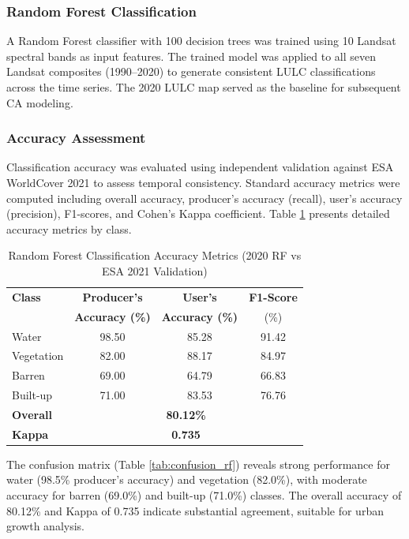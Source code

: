 \documentclass[conference]{IEEEtran}
\begin{document}
\subsubsection{Random Forest Classification}
A Random Forest classifier with 100 decision trees was trained using 10 Landsat spectral bands as input features. The trained model was applied to all seven Landsat composites (1990--2020) to generate consistent LULC classifications across the time series. The 2020 LULC map served as the baseline for subsequent CA modeling.

\subsubsection{Accuracy Assessment}
Classification accuracy was evaluated using independent validation against ESA WorldCover 2021 to assess temporal consistency. Standard accuracy metrics were computed including overall accuracy, producer's accuracy (recall), user's accuracy (precision), F1-scores, and Cohen's Kappa coefficient. Table \ref{tab:rf_accuracy} presents detailed accuracy metrics by class.

\begin{table}[!t]
\caption{Random Forest Classification Accuracy Metrics (2020 RF vs ESA 2021 Validation)}
\label{tab:rf_accuracy}
\centering
\small
\begin{tabular}{lccc}
\toprule
\textbf{Class} & \textbf{Producer's} & \textbf{User's} & \textbf{F1-Score} \\
 & \textbf{Accuracy (\%)} & \textbf{Accuracy (\%)} & (\%) \\
\midrule
Water & 98.50 & 85.28 & 91.42 \\
Vegetation & 82.00 & 88.17 & 84.97 \\
Barren & 69.00 & 64.79 & 66.83 \\
Built-up & 71.00 & 83.53 & 76.76 \\
\midrule
\textbf{Overall} & \multicolumn{3}{c}{\textbf{80.12\%}} \\
\textbf{Kappa} & \multicolumn{3}{c}{\textbf{0.735}} \\
\bottomrule
\end{tabular}
\end{table}

The confusion matrix (Table \ref{tab:confusion_rf}) reveals strong performance for water (98.5\% producer's accuracy) and vegetation (82.0\%), with moderate accuracy for barren (69.0\%) and built-up (71.0\%) classes. The overall accuracy of 80.12\% and Kappa of 0.735 indicate substantial agreement, suitable for urban growth analysis.
\end{document}
